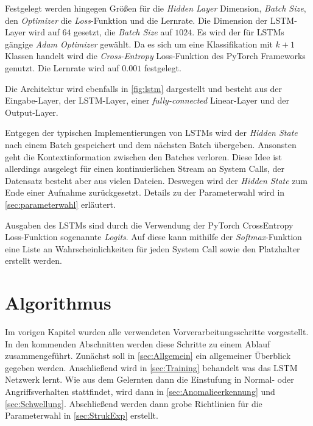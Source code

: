         Festgelegt werden hingegen Größen für die \textit{Hidden Layer} Dimension, \textit{Batch Size}, den \textit{Optimizer} die \textit{Loss}-Funktion und die Lernrate.
        Die Dimension der \ac{LSTM}-Layer wird auf $64$ gesetzt, die \textit{Batch Size} auf $1024$.
        Es wird der für \acp{LSTM} gängige \textit{Adam Optimizer} gewählt.
        Da es sich um eine Klassifikation mit $k+1$ Klassen handelt wird die \textit{Cross-Entropy} Loss-Funktion des PyTorch Frameworks genutzt.
        Die Lernrate wird auf $0.001$ festgelegt.

        Die Architektur wird ebenfalls in \autoref{fig:lstm} dargestellt und besteht aus der Eingabe-Layer, der \ac{LSTM}-Layer, einer \textit{fully-connected} Linear-Layer und der Output-Layer.

        Entgegen der typischen Implementierungen von \acp{LSTM} wird der \textit{Hidden State} nach einem Batch gespeichert und dem nächsten Batch  übergeben. 
        Ansonsten geht die Kontextinformation zwischen den Batches verloren.
        Diese Idee ist allerdings ausgelegt für einen kontinuierlichen Stream an System Calls, der Datensatz besteht aber aus vielen Dateien.
        Deswegen wird der \textit{Hidden State} zum Ende einer Aufnahme zurückgesetzt.
        Details zu der Parameterwahl wird in \autoref{sec:parameterwahl} erläutert.

        Ausgaben des \acp{LSTM} sind durch die Verwendung der PyTorch CrossEntropy Loss-Funktion sogenannte \textit{Logits}.
        Auf diese kann mithilfe der \textit{Softmax}-Funktion eine Liste an Wahrscheinlichkeiten für jeden System Call sowie den Platzhalter erstellt werden.

    \section{Algorithmus}\label{sec:Algorithmus}
        Im vorigen Kapitel wurden alle verwendeten Vorverarbeitungsschritte vorgestellt.
        In den kommenden Abschnitten werden diese Schritte zu einem Ablauf zusammengeführt.
        Zunächst soll in \autoref{sec:Allgemein} ein allgemeiner Überblick gegeben werden.
        Anschließend wird in \autoref{sec:Training} behandelt was das \ac{LSTM} Netzwerk lernt.
        Wie aus dem Gelernten dann die Einstufung in Normal- oder Angriffsverhalten stattfindet, wird dann in \autoref{sec:Anomalieerkennung} und \autoref{sec:Schwellung}.
        Abschließend werden dann grobe Richtlinien für die Parameterwahl in \autoref{sec:StrukExp} erstellt.

